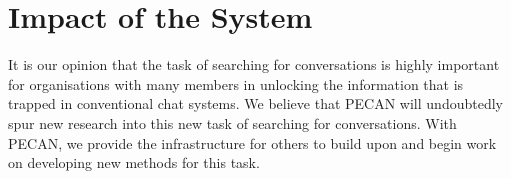 \section{Impact of the System}

It is our opinion that the task of searching for conversations is highly important for organisations with many members in unlocking the information that is trapped in conventional chat systems. We believe that PECAN will undoubtedly spur new research into this new task of searching for conversations. With PECAN, we provide the infrastructure for others to build upon and begin work on developing new methods for this task. 